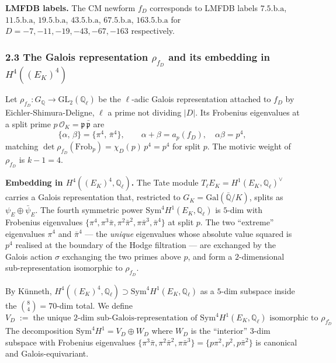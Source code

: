 \documentclass[
  11pt,
  a4paper,
]{amsart}
\begin{document}
\textbf{LMFDB labels.} The CM newform \(f_D\) corresponds to LMFDB labels \(7.5.\mathrm{b}.\mathrm{a}\), \(11.5.\mathrm{b}.\mathrm{a}\), \(19.5.\mathrm{b}.\mathrm{a}\), \(43.5.\mathrm{b}.\mathrm{a}\), \(67.5.\mathrm{b}.\mathrm{a}\), \(163.5.\mathrm{b}.\mathrm{a}\) for \(D = -7,-11,-19,-43,-67,-163\) respectively.

\hypertarget{the-galois-representation-rho_f_d-and-its-embedding-in-h4e_k4}{%
\subsubsection{\texorpdfstring{2.3 The Galois representation \(\rho_{f_D}\) and its embedding in \(H^4((E_K)^4)\)}{2.3 The Galois representation \textbackslash rho\_\{f\_D\} and its embedding in H\^{}4((E\_K)\^{}4)}}\label{the-galois-representation-rho_f_d-and-its-embedding-in-h4e_k4}}

Let \(\rho_{f_D} : G_\mathbb{Q} \to \mathrm{GL}_2(\mathbb{Q}_\ell)\) be the \(\ell\)-adic Galois representation attached to \(f_D\) by Eichler-Shimura-Deligne, \(\ell\) a prime not dividing \(|D|\). Its Frobenius eigenvalues at a split prime \(p\,\mathcal{O}_K = \mathfrak{p}\,\bar{\mathfrak{p}}\) are
\[
\{\alpha,\,\beta\} = \{\pi^4,\,\bar\pi^4\}, \qquad \alpha + \beta = a_p(f_D), \quad \alpha\beta = p^4,
\]
matching \(\det \rho_{f_D}(\mathrm{Frob}_p) = \chi_D(p)\,p^4 = p^4\) for split \(p\). The motivic weight of \(\rho_{f_D}\) is \(k - 1 = 4\).

\textbf{Embedding in \(H^4((E_K)^4, \mathbb{Q}_\ell)\).} The Tate module \(T_\ell E_K = H^1(E_K, \mathbb{Q}_\ell)^\vee\) carries a Galois representation that, restricted to \(G_K = \mathrm{Gal}(\bar{\mathbb{Q}}/K)\), splits as \(\psi_E \oplus \bar\psi_E\). The fourth symmetric power \(\mathrm{Sym}^4 H^1(E_K, \mathbb{Q}_\ell)\) is \(5\)-dim with Frobenius eigenvalues \(\{\pi^4, \pi^3\bar\pi, \pi^2\bar\pi^2, \pi\bar\pi^3, \bar\pi^4\}\) at split \(p\). The two ``extreme'' eigenvalues \(\pi^4\) and \(\bar\pi^4\) --- the \emph{unique} eigenvalues whose absolute value squared is \(p^4\) realised at the boundary of the Hodge filtration --- are exchanged by the Galois action \(\sigma\) exchanging the two primes above \(p\), and form a \(2\)-dimensional sub-representation isomorphic to \(\rho_{f_D}\).

By Künneth, \(H^4((E_K)^4, \mathbb{Q}_\ell) \supset \mathrm{Sym}^4 H^1(E_K, \mathbb{Q}_\ell)\) as a \(5\)-dim subspace inside the \(\binom{8}{4} = 70\)-dim total. We define
\begin{equation}
V_D \;:=\; \text{the unique $2$-dim sub-Galois-representation of $\mathrm{Sym}^4 H^1(E_K, \mathbb{Q}_\ell)$ isomorphic to $\rho_{f_D}$}.
\tag{2.2}
\end{equation}
The decomposition \(\mathrm{Sym}^4 H^1 = V_D \oplus W_D\) where \(W_D\) is the ``interior'' \(3\)-dim subspace with Frobenius eigenvalues \(\{\pi^3\bar\pi, \pi^2\bar\pi^2, \pi\bar\pi^3\} = \{p\pi^2, p^2, p\bar\pi^2\}\) is canonical and Galois-equivariant.
\end{document}
